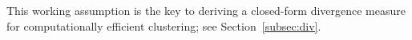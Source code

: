\documentclass[12pt,compact]{article}
\begin{document}
This working assumption is the key to deriving a closed-form divergence measure for computationally efficient clustering; see Section~\ref{subsec:div}.
\end{document}
